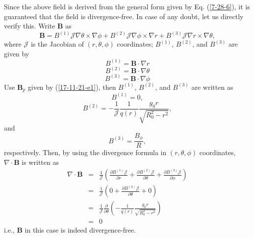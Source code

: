 \documentclass{llncs}
\begin{document}
Since the above field is derived from the general form given by Eq.
(\ref{7-28-6}), it is guaranteed that the field is divergence-free. In case of
any doubt, let us directly verify this. Write $\mathbf{B}$ as
\begin{equation}
  \mathbf{B}= B^{(1)} \mathcal{J} \nabla \theta \times \nabla \phi + B^{(2)}
  \mathcal{J} \nabla \phi \times \nabla r + B^{(3)} \mathcal{J} \nabla r
  \times \nabla \theta,
\end{equation}
where $\mathcal{J}$ is the Jacobian of $(r, \theta, \phi)$ coordinates;
$B^{(1)}$, $B^{(2)}$, and $B^{(3)}$ are given by
\begin{equation}
  B^{(1)} =\mathbf{B} \cdot \nabla r
\end{equation}
\begin{equation}
  B^{(2)} =\mathbf{B} \cdot \nabla \theta
\end{equation}
\begin{equation}
  B^{(3)} =\mathbf{B} \cdot \nabla \phi
\end{equation}
Use $\mathbf{B}_p$ given by (\ref{17-11-21-e1}), then $B^{(1)}$, $B^{(2)}$,
and $B^{(3)}$ are written as
\begin{equation}
  B^{(1)} = 0,
\end{equation}
\begin{equation}
  B^{(2)} = - \frac{1}{\mathcal{J}}  \frac{1}{q (r)}  \frac{g_0 r}{\sqrt{R_0^2
  - r^2}},
\end{equation}
and
\begin{equation}
  B^{(3)} = \frac{B_{\phi}}{R},
\end{equation}
respectively. Then, by using the divergence formula in $(r, \theta, \phi)$
coordinates, $\nabla \cdot \mathbf{B}$ is written as
\begin{eqnarray}
  \nabla \cdot \mathbf{B} & = & \frac{1}{\mathcal{J}} \left( \frac{\partial
  B^{(1)} \mathcal{J}}{\partial r} + \frac{\partial B^{(2)}
  \mathcal{J}}{\partial \theta} + \frac{\partial B^{(3)} \mathcal{J}}{\partial
  \phi} \right) \nonumber\\
  & = & \frac{1}{\mathcal{J}} \left( 0 + \frac{\partial B^{(2)}
  \mathcal{J}}{\partial \theta} + 0 \right) \nonumber\\
  & = & \frac{1}{\mathcal{J}} \frac{\partial}{\partial \theta} \left( -
  \frac{1}{q (r)}  \frac{g_0 r}{\sqrt{R_0^2 - r^2}} \right) \nonumber\\
  & = & 0 
\end{eqnarray}
i.e., $\mathbf{B}$ in this case is indeed divergence-free.
\end{document}
